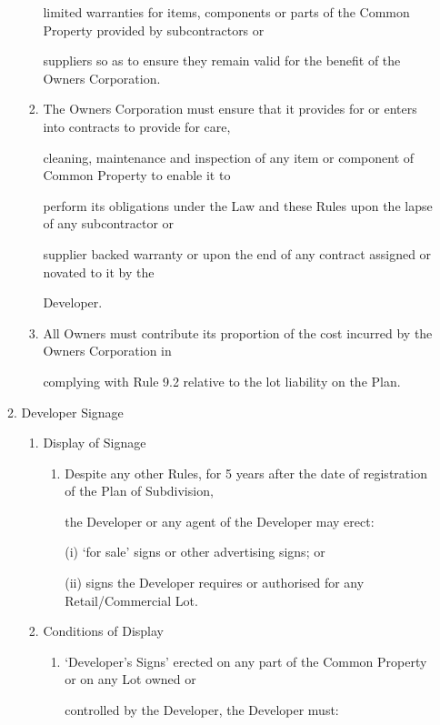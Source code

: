 \documentclass{article}
\begin{document}
\begin{enumerate}[label=\arabic*.]
\begin{enumerate}[label=\arabic{enumi}.\arabic*.]
\begin{enumerate}[label=(\arabic*)]
limited warranties for items, components or parts of the Common Property provided by subcontractors or 

suppliers so as to ensure they remain valid for the benefit of the Owners Corporation. 

\item  The Owners Corporation must ensure that it provides for or enters into contracts to provide for care, 

cleaning, maintenance and inspection of any item or component of Common Property to enable it to 

perform its obligations under the Law and these Rules upon the lapse of any subcontractor or 

supplier backed warranty or upon the end of any contract assigned or novated to it by the 

Developer. 

\item  All Owners must contribute its proportion of the cost incurred by the Owners Corporation in 

complying with Rule 9.2 relative to the lot liability on the Plan. 

\end{enumerate}
\item  Developer Signage 

\begin{enumerate}[label=(\arabic*)]
\item  Display of Signage 

\begin{enumerate}[label=(\alph*)]
\item  Despite any other Rules, for 5 years after the date of registration of the Plan of Subdivision, 

the Developer or any agent of the Developer may erect: 

(i) ‘for sale’ signs or other advertising signs; or 

(ii) signs the Developer requires or authorised for any Retail/Commercial Lot. 

\end{enumerate}
\item  Conditions of Display 

\begin{enumerate}[label=(\alph*)]
\item  ‘Developer’s Signs’ erected on any part of the Common Property or on any Lot owned or 

controlled by the Developer, the Developer must: 


\end{enumerate}
\end{enumerate}
\end{enumerate}
\end{enumerate}
\end{document}
